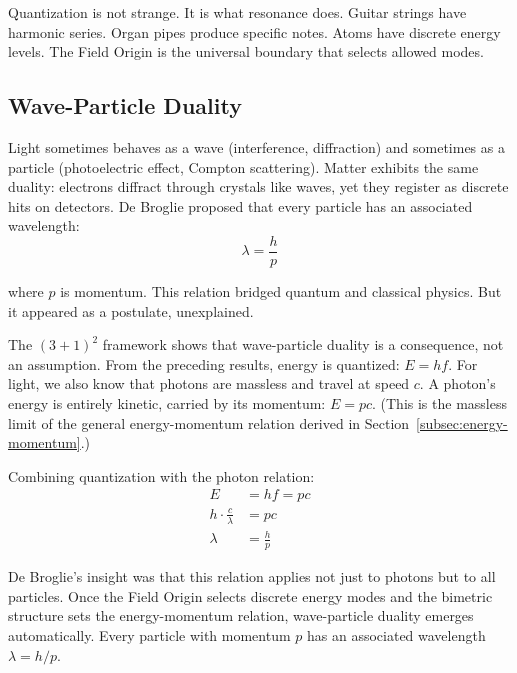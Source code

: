 \documentclass[aps,prd,preprint,superscriptaddress,showpacs,preprintnumbers,amsmath,amssymb,nofootinbib]{revtex4-2}
\begin{document}
Quantization is not strange. It is what resonance does. Guitar strings have harmonic series. Organ pipes produce specific notes. Atoms have discrete energy levels. The Field Origin is the universal boundary that selects allowed modes.

\subsection{Wave-Particle Duality}
\label{subsec:debroglie}

Light sometimes behaves as a wave (interference, diffraction) and sometimes as a particle (photoelectric effect, Compton scattering). Matter exhibits the same duality: electrons diffract through crystals like waves, yet they register as discrete hits on detectors. De Broglie proposed that every particle has an associated wavelength:
\begin{equation}
\lambda = \frac{h}{p}
\end{equation}

where $p$ is momentum. This relation bridged quantum and classical physics. But it appeared as a postulate, unexplained.

The $(3+1)^2$ framework shows that wave-particle duality is a consequence, not an assumption. From the preceding results, energy is quantized: $E = hf$. For light, we also know that photons are massless and travel at speed $c$. A photon's energy is entirely kinetic, carried by its momentum: $E = pc$. (This is the massless limit of the general energy-momentum relation derived in Section~\ref{subsec:energy-momentum}.)

Combining quantization with the photon relation:
\begin{align}
E &= hf = pc \\
h \cdot \frac{c}{\lambda} &= pc \\
\lambda &= \frac{h}{p}
\end{align}

De Broglie's insight was that this relation applies not just to photons but to all particles. Once the Field Origin selects discrete energy modes and the bimetric structure sets the energy-momentum relation, wave-particle duality emerges automatically. Every particle with momentum $p$ has an associated wavelength $\lambda = h/p$.

\vspace{1em}
\noindent
{}
\vspace{1cm}
\end{document}
